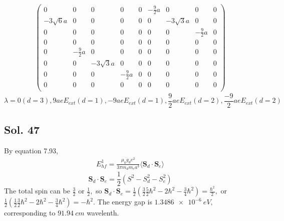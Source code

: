 \begin{enumerate}
\begin{align*}
\begin{pmatrix}
            0 & 0 & 0 &0 &0 &-\frac{9}{2}a &0 &0 &0 \\
            -3\sqrt{6}a & 0 & 0 &0 &0 &0 &-3\sqrt{3}a &0 &0 \\
            0 & 0 & 0 &0 &0 &0 & 0&-\frac{9}{2}a &0 \\
            0 & 0 & 0 &0 &0 &0 &0 &0 &0 \\
            0 & -\frac{9}{2}a & 0 &0 &0 &0 &0 &0 &0 \\
            0 & 0 & -3\sqrt{3}a &0 &0 &0 &0 &0 &0 \\
            0 & 0 & 0 &-\frac{9}{2}a &0 &0 &0 &0 &0 \\
            0 & 0 & 0 &0 &0 &0 &0 &0 &0 \\
        \end{pmatrix}
    \end{align*}
    $$
    \lambda=0(d=3), 9aeE_{ext}(d=1), -9aeE_{ext}(d=1),
    \frac{9}{2}aeE_{ext}(d=2), \frac{-9}{2}aeE_{ext}(d=2)
    $$
    
\end{enumerate}

\subsection*{Sol. 47}
By equation 7.93,
\begin{align*}
    E^1_{hf} = 
    \frac{\mu_0g_de^2}{3\pi m_dm_e a^3}\langle \bm S_d\cdot \bm S_e\rangle
\end{align*}
$$
\bm S_d\cdot \bm S_e
=\frac{1}{2}(S^2 - S_d^2 - S_e^2)
$$
The total spin can be $\frac{3}{2}$ or $\frac{1}{2},$ so 
$\bm S_d\cdot \bm S_e = \frac{1}{2}(\frac{3}{2}\frac{5}{2}\hbar^2 - 2\hbar^2 - \frac{3}{4}\hbar^2)=\frac{\hbar^2}{2},$ or 
$\frac{1}{2}(\frac{1}{2}\frac{3}{2}\hbar^2 - 2\hbar^2 - \frac{3}{4}\hbar^2)=-\hbar^2.$
The energy gap is $\qty{1.3486e-6}{eV},$ corresponding to $\qty{91.94}{cm}$ wavelenth.

